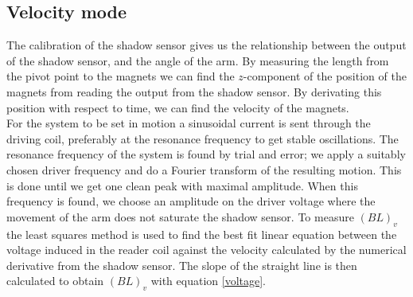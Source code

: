 \documentclass[english,a4paper,12pt,reprint]{revtex4-1}
\begin{document}
\subsection{Velocity mode}
The calibration of the shadow sensor gives us the relationship between the output of the shadow sensor, and the angle of the arm. By measuring the length from the pivot point to the magnets we can find the $z$-component of the position of the magnets from reading the output from the shadow sensor. By derivating this position with respect to time, we can find the velocity of the magnets. \\
For the system to be set in motion a sinusoidal current is sent through the driving coil, preferably at the resonance frequency to get stable oscillations. The resonance frequency of the system is found by trial and error; we apply a suitably chosen driver frequency and do a Fourier transform of the resulting motion. This is done until we get one clean peak with maximal amplitude.
 When this frequency is found, we choose an amplitude on the driver voltage where the movement of the arm does not saturate the shadow sensor. To measure $\left(BL\right)_v$ the least squares method is used to find the best fit linear equation between the voltage induced in the reader coil against the velocity calculated by the numerical derivative from the shadow sensor. The slope of the straight line is then calculated to obtain  $\left(BL\right)_v$ with equation \eqref{voltage}.
\end{document}

